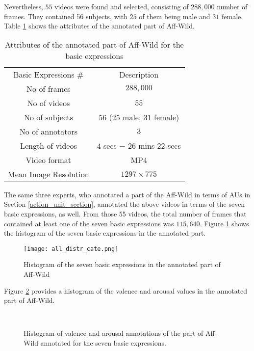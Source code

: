 \documentclass[a4paper, 10pt, conference]{ieeeconf}      %
\begin{document}
Nevertheless, $55$ videos were found and selected, consisting of $288,000$ number of frames. They contained 56 subjects, with $25$ of them being male and $31$ female. Table \ref{attrs2} shows the attributes of the annotated part of Aff-Wild. 


\begin{table}[h]
\caption{Attributes of the annotated part of Aff-Wild for the basic expressions}
\label{attrs2}
\centering
\begin{tabular}{|c|c|}
\hline
Basic Expressions \# & Description \\ 
\hhline{|=|=|}
No of frames  & $288,000$ \\
\hline
No of videos & $55$ \\
\hline
No of subjects  & $56$ ($25$ male; $31$ female)  \\
\hline
No of annotators  & $3$ \\
\hline
Length of videos & $4$ secs $-$ $26$ mins $22$ secs  \\
\hline
Video format & MP$4$\\
\hline
Mean Image Resolution & $1297 \times 775 $\\
\hline
\end{tabular}
\end{table}

The same three experts, who annotated a part of the Aff-Wild in terms of AUs in Section \ref{action_unit_section}, annotated the above videos in terms of the seven basic expressions, as well.
From those 55 videos, the total number of frames that contained at least one of the seven basic expressions was $115,640$. Figure \ref{tab:frame_number_basic_expr} shows the histogram of the seven basic expressions in the annotated part.


\begin{figure}[h]
\centering
\texttt{[image: all\_distr\_cate.png]}
\caption{Histogram of the seven basic expressions in the annotated part of Aff-Wild}
\label{tab:frame_number_basic_expr}
\vskip -0.2cm
\end{figure}

Figure \ref{hist_va_bas_expr} provides a histogram of the valence and arousal
values in the annotated part of Aff-Wild.

\begin{figure}[h]
\centering
{}\\
\caption{Histogram of valence and arousal annotations of the part of Aff-Wild annotated for the seven basic expressions.}
\label{hist_va_bas_expr}
\vskip -0.3cm
\end{figure}
\end{document}
